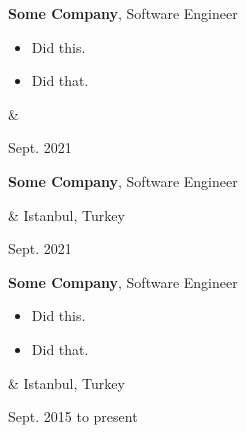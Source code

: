 \documentclass[10pt, letterpaper]{article}
\newenvironment{highlights}{
        \begin{itemize}[
                topsep=0pt,
                parsep=0.10 cm,
                partopsep=0pt,
                itemsep=0pt,
                after=\vspace{-1\baselineskip},
                leftmargin=0.4 cm + 3pt
            ]
    }{
        \end{itemize}
    } %
\let\originalTabularx\tabularx
\let\originalEndTabularx\endtabularx
\renewenvironment{tabularx}{\bgroup\centering\originalTabularx}{\originalEndTabularx\par\egroup}
\begin{document}
        \vspace{0.2 cm}
        \begin{tabularx}{
            \textwidth-0.4 cm-0.13cm
        }{
            K{0.2 cm}
            R{4.1 cm}
        }
            \textbf{Some Company}, Software Engineer

            \vspace{0.10 cm}

            \begin{highlights}
                \item Did this.
                \item Did that.
            \end{highlights}
            &
            

            Sept. 2021
        \end{tabularx}

        \vspace{0.2 cm}
        \begin{tabularx}{
            \textwidth-0.4 cm-0.13cm
        }{
            K{0.2 cm}
            R{4.1 cm}
        }
            \textbf{Some Company}, Software Engineer

            \vspace{0.10 cm}

            &
            Istanbul, Turkey

            Sept. 2021
        \end{tabularx}

        \vspace{0.2 cm}
        \begin{tabularx}{
            \textwidth-0.4 cm-0.13cm
        }{
            K{0.2 cm}
            R{4.1 cm}
        }
            \textbf{Some Company}, Software Engineer

            \vspace{0.10 cm}

            \begin{highlights}
                \item Did this.
                \item Did that.
            \end{highlights}
            &
            Istanbul, Turkey

            Sept. 2015 to present
        \end{tabularx}
\end{document}
